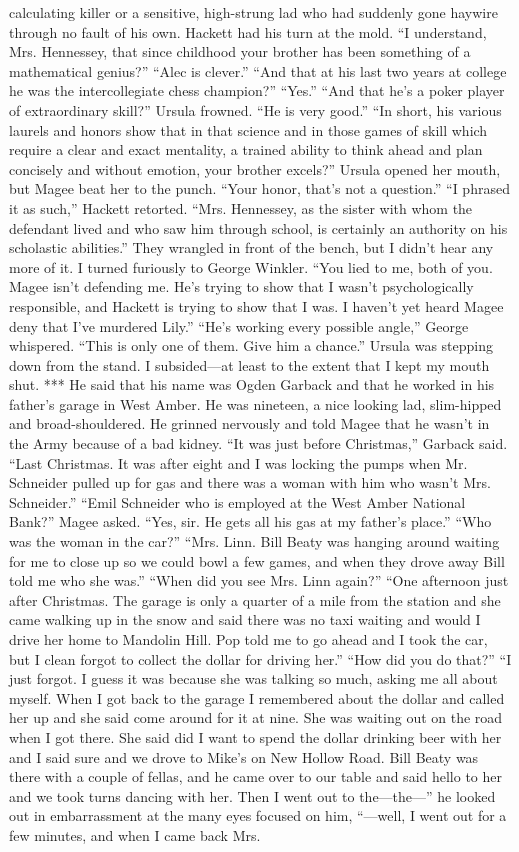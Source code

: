 \documentclass{novel}
\begin{document}
calculating killer or a sensitive, high-strung lad who had suddenly gone haywire through no fault of his own. Hackett had his turn at the mold. “I understand, Mrs. Hennessey, that since childhood your brother has been something of a mathematical genius?” “Alec is clever.” “And that at his last two years at college he was the intercollegiate chess champion?” “Yes.” “And that he’s a poker player of extraordinary skill?” Ursula frowned. “He is very good.” “In short, his various laurels and honors show that in that science and in those games of skill which require a clear and exact mentality, a trained ability to think ahead and plan concisely and without emotion, your brother excels?” Ursula opened her mouth, but Magee beat her to the punch. “Your honor, that’s not a question.” “I phrased it as such,” Hackett retorted. “Mrs. Hennessey, as the sister with whom the defendant lived and who saw him through school, is certainly an authority on his scholastic abilities.” They wrangled in front of the bench, but I didn’t hear any more of it. I turned furiously to George Winkler. “You lied to me, both of you. Magee isn’t defending me. He’s trying to show that I wasn’t psychologically responsible, and Hackett is trying to show that I was. I haven’t yet heard Magee deny that I’ve murdered Lily.” “He’s working every possible angle,” George whispered. “This is only one of them. Give him a chance.” Ursula was stepping down from the stand. I subsided—at least to the extent that I kept my mouth shut. *** He said that his name was Ogden Garback and that he worked in his father’s garage in West Amber. He was nineteen, a nice looking lad, slim-hipped and broad-shouldered. He grinned nervously and told Magee that he wasn’t in the Army because of a bad kidney. “It was just before Christmas,” Garback said. “Last Christmas. It was after eight and I was locking the pumps when Mr. Schneider pulled up for gas and there was a woman with him who wasn’t Mrs. Schneider.” “Emil Schneider who is employed at the West Amber National Bank?” Magee asked. “Yes, sir. He gets all his gas at my father’s place.” “Who was the woman in the car?” “Mrs. Linn. Bill Beaty was hanging around waiting for me to close up so we could bowl a few games, and when they drove away Bill told me who she was.” “When did you see Mrs. Linn again?” “One afternoon just after Christmas. The garage is only a quarter of a mile from the station and she came walking up in the snow and said there was no taxi waiting and would I drive her home to Mandolin Hill. Pop told me to go ahead and I took the car, but I clean forgot to collect the dollar for driving her.” “How did you do that?” “I just forgot. I guess it was because she was talking so much, asking me all about myself. When I got back to the garage I remembered about the dollar and called her up and she said come around for it at nine. She was waiting out on the road when I got there. She said did I want to spend the dollar drinking beer with her and I said sure and we drove to Mike’s on New Hollow Road. Bill Beaty was there with a couple of fellas, and he came over to our table and said hello to her and we took turns dancing with her. Then I went out to the—the—” he looked out in embarrassment at the many eyes focused on him, “—well, I went out for a few minutes, and when I came back Mrs. 
\end{document}
